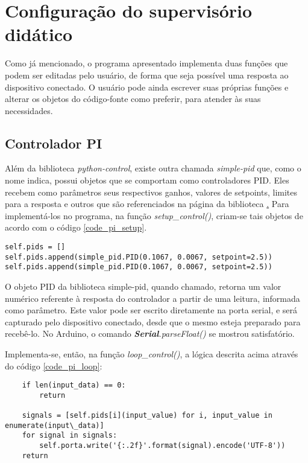 \section{Configuração do supervisório didático}

Como já mencionado, o programa apresentado implementa duas funções que podem ser editadas pelo usuário, de forma que seja possível uma resposta ao dispositivo conectado. O usuário pode ainda escrever suas próprias funções e alterar os objetos do código-fonte como preferir, para atender às suas necessidades. 

\subsection{Controlador PI}

Além da biblioteca \emph{python-control}, existe outra chamada \emph{simple-pid} que, como o nome indica, possui objetos que se comportam como controladores PID. Eles recebem como parâmetros seus respectivos ganhos, valores de setpoints, limites para a resposta e outros que são referenciados na página da biblioteca \href{https://pypi.org/project/simple-pid/}. Para implementá-los no programa, na função \emph{setup\_control()}, criam-se tais objetos de acordo com o código \ref{code_pi_setup}.

\begin{code}
\begin{lstlisting}
self.pids = []
self.pids.append(simple_pid.PID(0.1067, 0.0067, setpoint=2.5))
self.pids.append(simple_pid.PID(0.1067, 0.0067, setpoint=2.5))
\end{lstlisting}
\label{code_pi_setup}
\end{code}

O objeto PID da biblioteca simple-pid, quando chamado, retorna um valor numérico referente à resposta do controlador a partir de uma leitura, informada como parâmetro. Este valor pode ser escrito diretamente na porta serial, e será capturado pelo dispositivo conectado, desde que o mesmo esteja preparado para recebê-lo. No Arduino, o comando \emph{\textbf{Serial}.parseFloat()} se mostrou satisfatório.

Implementa-se, então, na função \emph{loop\_control()}, a lógica descrita acima através do código \ref{code_pi_loop}:

\begin{code}
\begin{lstlisting}
	if len(input_data) == 0:
		return

	signals = [self.pids[i](input_value) for i, input_value in enumerate(input\_data)]
	for signal in signals:
		self.porta.write('{:.2f}'.format(signal).encode('UTF-8'))
	return
\end{lstlisting}
\label{code_pi_loop}
\end{code}

